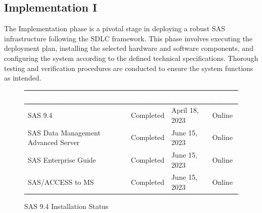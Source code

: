 \subsection{Implementation I}

The Implementation phase is a pivotal stage in deploying a robust SAS infrastructure following the SDLC framework. This phase involves executing the deployment plan, installing the selected hardware and software components, and configuring the system according to the defined technical specifications. Thorough testing and verification procedures are conducted to ensure the system functions as intended.

\begin{figure}[H]
    \begin{center}
        \renewcommand{\arraystretch}{1.5}
        \begin{tabular}{|>{\raggedright\arraybackslash}m{9cm}
                        |>{\raggedright\arraybackslash}l
                        |>{\raggedright\arraybackslash}l
                        |>{\raggedright\arraybackslash}l
                        |}
        \hline
        \rowcolor[HTML]{196fb4}\centering\textcolor{white}{\large Software} 
                                & \centering\textcolor{white}{\large Installed}
                                & \centering\textcolor{white}{\large Date}
                                & \centering\textcolor{white}{\large Status}
                                \tabularnewline 
        \hline
        SAS 9.4 & Completed & April 18, 2023 & Online\\\hline
        SAS Data Management Advanced Server & Completed & June 15, 2023 & Online\\\hline
        SAS Enterprise Guide & Completed & June 15, 2023 & Online\\\hline
        SAS/ACCESS to MS & Completed & June 15, 2023 & Online\\\hline
        \end{tabular}
    \end{center}
\caption{SAS 9.4 Installation Status}
\label{SAS 9.4 Installation Status}
\end{figure}

